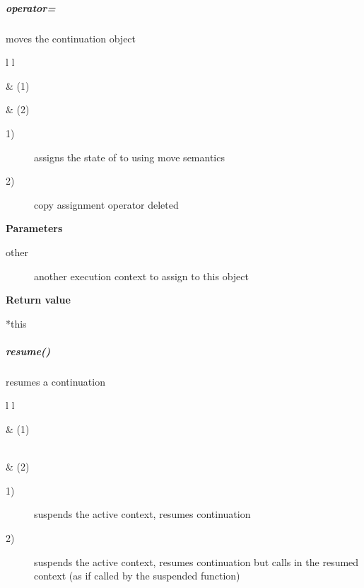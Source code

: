 \subparagraph*{operator=}
moves the continuation object\\

\begin{tabular}{ l l }
    \midrule

     & (1)\\

    \midrule

     & (2)\\

    \midrule
\end{tabular}

\begin{description}
    \item[1)] assigns the state of  to  using move semantics
    \item[2)] copy assignment operator deleted
\end{description}

{\bfseries Parameters}
\begin{description}
    \item[other]   another execution context to assign to this object\\
\end{description}

{\bfseries Return value}
\begin{description}
    \item[*this]
\end{description}


\subparagraph*{resume()}
resumes a continuation\\

\begin{tabular}{ l l }
    \midrule

     & (1)\\

    \midrule

    \\
     & (2)\\

    \midrule
\end{tabular}

\begin{description}
    \item[1)] suspends the active context, resumes continuation 
    \item[2)] suspends the active context, resumes continuation 
              but calls  in the resumed context (as if called by the
              suspended function)
\end{description}


